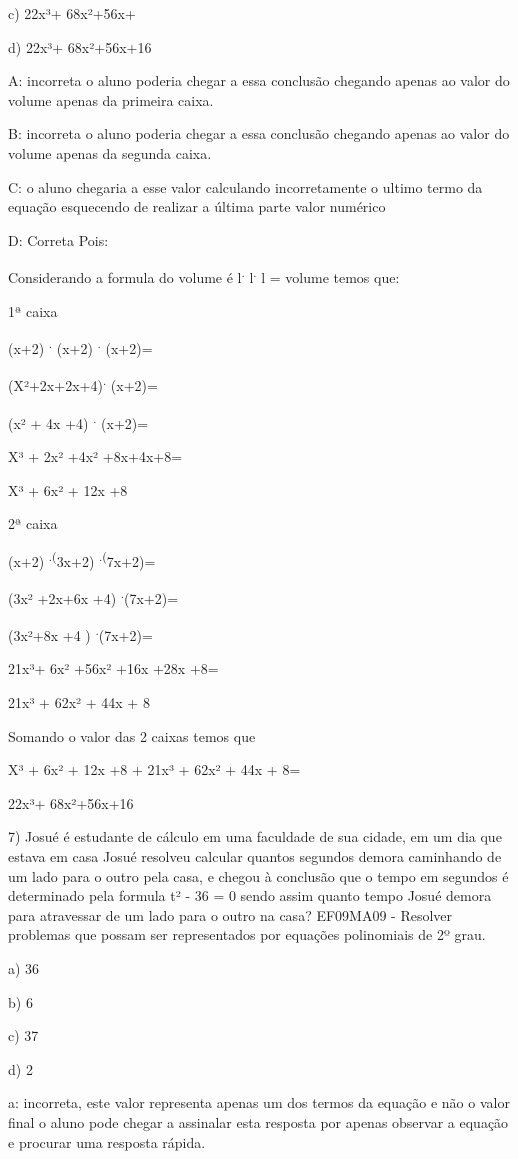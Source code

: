 c) 22x³+ 68x²+56x+

d) 22x³+ 68x²+56x+16

A: incorreta o aluno poderia chegar a essa conclusão chegando apenas ao
valor do volume apenas da primeira caixa.

B: incorreta o aluno poderia chegar a essa conclusão chegando apenas ao
valor do volume apenas da segunda caixa.

C: o aluno chegaria a esse valor calculando incorretamente o ultimo
termo da equação esquecendo de realizar a última parte valor numérico

D: Correta Pois:

Considerando a formula do volume é l\textsuperscript{.}
l\textsuperscript{.} l = volume temos que:

1ª caixa

(x+2) \textsuperscript{.} (x+2) \textsuperscript{.} (x+2)=

(X²+2x+2x+4)\textsuperscript{.} (x+2)=

(x² + 4x +4) \textsuperscript{.} (x+2)=

X³ + 2x² +4x² +8x+4x+8=

X³ + 6x² + 12x +8

2ª caixa

(x+2) \textsuperscript{.(}3x+2) \textsuperscript{.(}7x+2)=

(3x² +2x+6x +4) \textsuperscript{.}(7x+2)=

(3x²+8x +4 ) \textsuperscript{.}(7x+2)=

21x³+ 6x² +56x² +16x +28x +8=

21x³ + 62x² + 44x + 8

Somando o valor das 2 caixas temos que

X³ + 6x² + 12x +8 + 21x³ + 62x² + 44x + 8=

22x³+ 68x²+56x+16

7) Josué é estudante de cálculo em uma faculdade de sua cidade, em um
dia que estava em casa Josué resolveu calcular quantos segundos demora
caminhando de um lado para o outro pela casa, e chegou à conclusão que o
tempo em segundos é determinado pela formula t² - 36 = 0 sendo assim
quanto tempo Josué demora para atravessar de um lado para o outro na
casa? EF09MA09 - Resolver problemas que possam ser representados por
equações polinomiais de 2º grau.

a) 36

b) 6

c) 37

d) 2

a: incorreta, este valor representa apenas um dos termos da equação e
não o valor final o aluno pode chegar a assinalar esta resposta por
apenas observar a equação e procurar uma resposta rápida.

